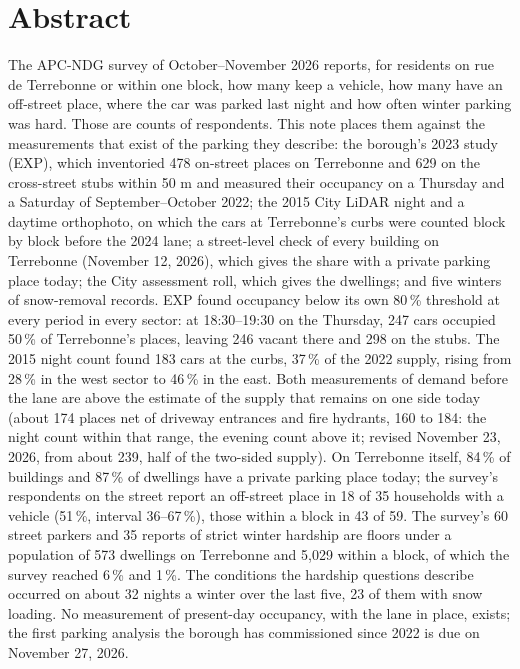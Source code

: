 \documentclass[11pt,a4paper]{article}
\begin{document}
\section*{Abstract}
The APC-NDG survey of October--November 2026 reports, for residents on rue de Terrebonne or within one block, how many keep a vehicle, how many have an off-street place, where the car was parked last night and how often winter parking was hard. Those are counts of respondents. This note places them against the measurements that exist of the parking they describe: the borough\textquoteright{}s 2023 study (EXP), which inventoried 478 on-street places on Terrebonne and 629 on the cross-street stubs within 50 m and measured their occupancy on a Thursday and a Saturday of September--October 2022; the 2015 City LiDAR night and a daytime orthophoto, on which the cars at Terrebonne\textquoteright{}s curbs were counted block by block before the 2024 lane; a street-level check of every building on Terrebonne (November 12, 2026), which gives the share with a private parking place today; the City assessment roll, which gives the dwellings; and five winters of snow-removal records. EXP found occupancy below its own 80\,\% threshold at every period in every sector: at 18:30--19:30 on the Thursday, 247 cars occupied 50\,\% of Terrebonne\textquoteright{}s places, leaving 246 vacant there and 298 on the stubs. The 2015 night count found 183 cars at the curbs, 37\,\% of the 2022 supply, rising from 28\,\% in the west sector to 46\,\% in the east. Both measurements of demand before the lane are above the estimate of the supply that remains on one side today (about 174 places net of driveway entrances and fire hydrants, 160 to 184: the night count within that range, the evening count above it; revised November 23, 2026, from about 239, half of the two-sided supply). On Terrebonne itself, 84\,\% of buildings and 87\,\% of dwellings have a private parking place today; the survey\textquoteright{}s respondents on the street report an off-street place in 18 of 35 households with a vehicle (51\,\%, interval 36--67\,\%), those within a block in 43 of 59. The survey\textquoteright{}s 60 street parkers and 35 reports of strict winter hardship are floors under a population of 573 dwellings on Terrebonne and 5,029 within a block, of which the survey reached 6\,\% and 1\,\%. The conditions the hardship questions describe occurred on about 32 nights a winter over the last five, 23 of them with snow loading. No measurement of present-day occupancy, with the lane in place, exists; the first parking analysis the borough has commissioned since 2022 is due on November 27, 2026.
\end{document}

